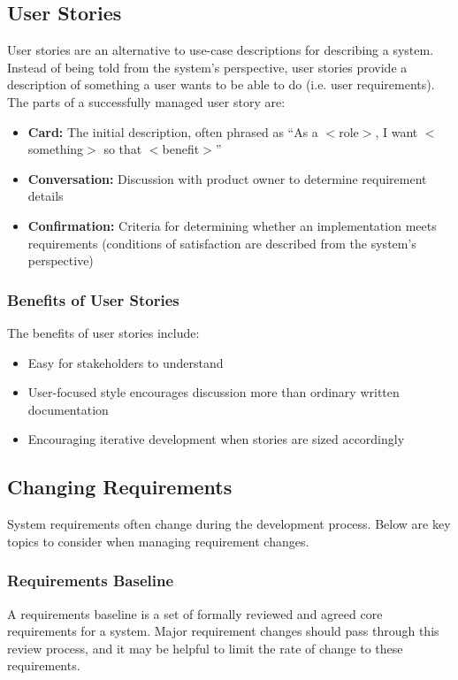 \documentclass[12pt,titlepage]{article}
\begin{document}
      \subsection{User Stories}
        User stories are an alternative to use-case descriptions for describing a system. Instead of being told from the system's perspective, user stories
        provide a description of something a user wants to be able to do (i.e. user requirements). The parts of a successfully managed user story are:
        \begin{itemize}
          \item \textbf{Card:} The initial description, often phrased as ``As a $<$role$>$, I want $<$something$>$ so that $<$benefit$>$''
          \item \textbf{Conversation:} Discussion with product owner to determine requirement details
          \item \textbf{Confirmation:} Criteria for determining whether an implementation meets requirements (conditions of satisfaction are described
          from the system's perspective)
        \end{itemize}

        \subsubsection{Benefits of User Stories}
          The benefits of user stories include:
          \begin{itemize}
            \item Easy for stakeholders to understand
            \item User-focused style encourages discussion more than ordinary written documentation
            \item Encouraging iterative development when stories are sized accordingly
          \end{itemize}

      \subsection{Changing Requirements}
        System requirements often change during the development process. Below are key topics to consider when managing requirement changes.

        \subsubsection{Requirements Baseline}
          A requirements baseline is a set of formally reviewed and agreed core requirements for a system. Major requirement changes should pass
          through this review process, and it may be helpful to limit the rate of change to these requirements.
\end{document}
